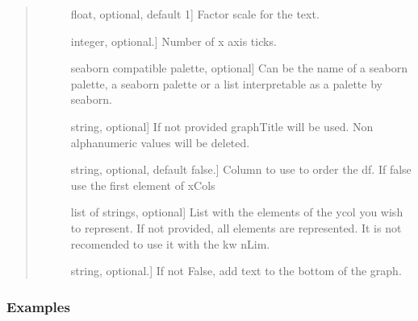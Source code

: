 \documentclass[letterpaper,10pt,english]{sphinxmanual}
\begin{document}
\begin{fulllineitems}
\begin{quote}
\begin{description}
\begin{description}
\item[{}] \leavevmode{[}float, optional, default 1{]}
Factor scale for the text.

\item[{}] \leavevmode{[}integer, optional.{]}
Number of x axis ticks.

\item[{}] \leavevmode{[}seaborn compatible palette, optional{]}
Can be the name of a seaborn palette, 
a seaborn palette or a list interpretable 
as a palette by seaborn.

\item[{}] \leavevmode{[}string, optional{]}
If not provided graphTitle will be used. 
Non alphanumeric values will be deleted.

\item[{}] \leavevmode{[}string, optional, default false.{]}
Column to use to order the df. 
If false use the first element of xCols

\item[{}] \leavevmode{[}list of strings, optional{]}
List with the elements of the ycol you wish to represent.
If not provided, all elements are represented. 
It is not recomended to use it with the kw nLim.

\item[{}] \leavevmode{[}string, optional.{]}
If not False, add text to the bottom of the graph.

\end{description}

\end{description}\end{quote}
\subsubsection*{Examples}


\end{fulllineitems}
\end{document}
